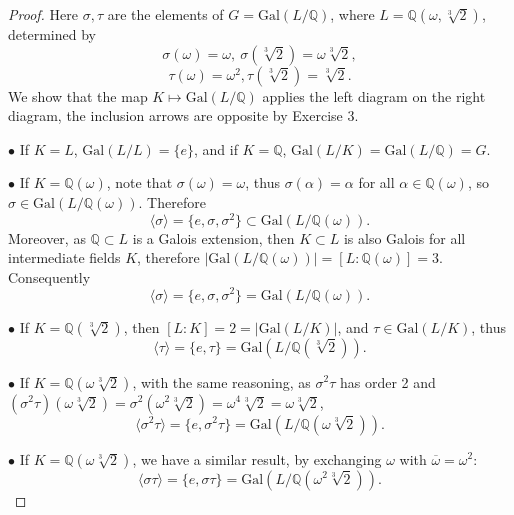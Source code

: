 \documentclass[11pt,a4paper]{article}
\newcommand{\Q}{\mathbb{Q}}
\newcommand{\Gal}{\mathrm{Gal}}
\begin{document}
\begin{proof}

\bigskip

Here $\sigma, \tau$ are  the elements of $G = \Gal(L/\Q)$, where $L = \Q(\omega,\sqrt[3]{2})$, determined by
 $$\sigma(\omega) = \omega, \ \sigma(\sqrt[3]{2}) = \omega \sqrt[3]{2},$$
 $$\tau(\omega) = \omega^2, \tau(\sqrt[3]{2}) =  \sqrt[3]{2}.$$
We show that the map $K \mapsto \Gal(L/\Q)$ applies the left diagram on the right diagram, the inclusion arrows are opposite by Exercise 3.

$\bullet$ If $K = L$, $\Gal(L/L) = \{e\}$, and if $K = \Q$, $\Gal(L/K) = \Gal(L/\Q)=G$.

$\bullet$ If $K = \Q(\omega)$, note that $\sigma(\omega) = \omega$, thus $\sigma(\alpha) = \alpha$ for all $\alpha \in \Q(\omega)$, so $\sigma \in \Gal(L/\Q(\omega))$. Therefore
$$\langle \sigma \rangle = \{e,\sigma,\sigma^2\} \subset \Gal(L/\Q(\omega)).$$
Moreover, as $\Q \subset L$ is a Galois extension, then $K \subset L$ is also Galois for all intermediate fields $K$, therefore $\vert \Gal(L/\Q(\omega)) \vert  =  [L : \Q(\omega)] = 3$. Consequently
$$\langle \sigma \rangle = \{e,\sigma,\sigma^2\} =\Gal(L/\Q(\omega)).$$

$\bullet$ If $K = \Q(\sqrt[3]{2})$, then $[L:K] = 2 = \vert \Gal(L/K) \vert $, and $\tau \in  \Gal(L/K)$, thus
$$\langle \tau \rangle = \{e,\tau\} = \Gal(L/\Q(\sqrt[3]{2})).$$

$\bullet$ If $K = \Q(\omega\sqrt[3]{2})$, with the same reasoning, as $\sigma^2 \tau$ has order 2 and $(\sigma^2 \tau)(\omega \sqrt[3]{2}) = \sigma^2(\omega^2 \sqrt[3]{2}) = \omega^4 \sqrt[3]{2}=\omega \sqrt[3]{2} $,
$$\langle\sigma ^2  \tau \rangle = \{e,\sigma^2\tau\} = \Gal(L/\Q(\omega \sqrt[3]{2})).$$

$\bullet$ If $K = \Q(\omega\sqrt[3]{2})$, we have a similar result, by exchanging $\omega$ with $\overline{\omega} = \omega^2$:
$$\langle \sigma\tau \rangle = \{e,\sigma \tau\} = \Gal(L/\Q(\omega^2 \sqrt[3]{2})).$$
\end{proof}
\end{document}
